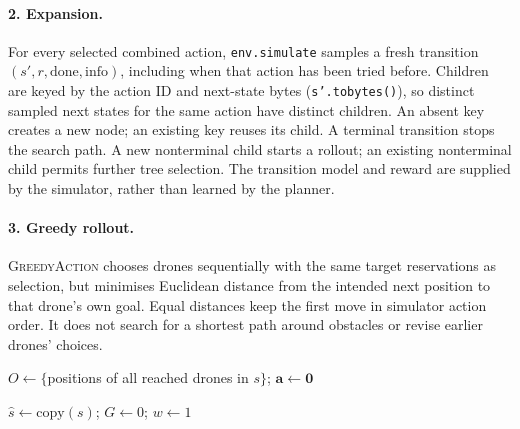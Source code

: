 \documentclass[11pt,a4paper]{article}
\begin{document}
\paragraph{2. Expansion.}
For every selected combined action, \texttt{env.simulate} samples a fresh transition $(s',r,\mathrm{done},\mathrm{info})$, including when that action has been tried before. Children are keyed by the action ID and next-state bytes (\texttt{s'.tobytes()}), so distinct sampled next states for the same action have distinct children. An absent key creates a new node; an existing key reuses its child. A terminal transition stops the search path. A new nonterminal child starts a rollout; an existing nonterminal child permits further tree selection. The transition model and reward are supplied by the simulator, rather than learned by the planner.

\paragraph{3. Greedy rollout.}
\textsc{GreedyAction} chooses drones sequentially with the same target reservations as selection, but minimises Euclidean distance from the intended next position to that drone's own goal. Equal distances keep the first move in simulator action order. It does not search for a shortest path around obstacles or revise earlier drones' choices.

\begin{algorithm}[H]
\small
\caption{\textsc{GreedyAction}$(s)$}
\label{alg:greedy-action}
$O\leftarrow\{$positions of all reached drones in $s\}$; $\mathbf{a}\leftarrow\mathbf{0}$\;
\;
\end{algorithm}

\begin{algorithm}[H]
\small
\caption{\textsc{Rollout}$(s,h,\mathrm{deadline})$}
\label{alg:greedy-rollout}
$\hat{s}\leftarrow\mathrm{copy}(s)$; $G\leftarrow0$; $w\leftarrow1$\;
\;
\end{algorithm}
\end{document}
